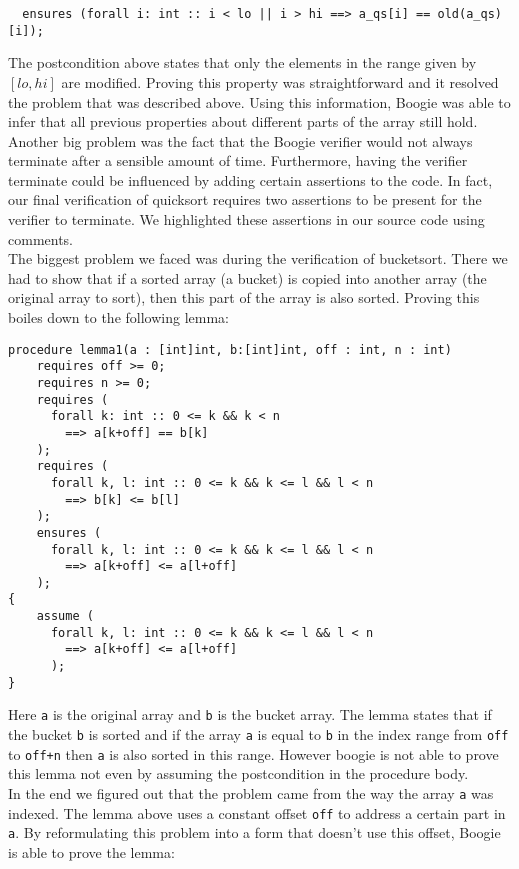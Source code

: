 \begin{verbatim}
  ensures (forall i: int :: i < lo || i > hi ==> a_qs[i] == old(a_qs)[i]);
\end{verbatim}

The postcondition above states that only the elements in the range given by $[lo, hi]$ are modified. Proving this
property was straightforward and it resolved the problem that was described above. Using this information, 
Boogie was able to infer that all previous properties about different parts of the array still hold.\\

Another big problem was the fact that the Boogie verifier would not always terminate after a 
sensible amount of time. Furthermore, having the verifier terminate could be influenced by
adding certain assertions to the code. In fact, our final verification of quicksort requires
two assertions to be present for the verifier to terminate. We highlighted these assertions in our
source code using comments.\\

The biggest problem we faced was during the verification of bucketsort. There we had to show
that if a sorted array (a bucket) is copied into another array (the original array to sort), 
then this part of the array is also sorted. Proving this boiles down to the following lemma:

\begin{verbatim}
procedure lemma1(a : [int]int, b:[int]int, off : int, n : int) 
    requires off >= 0;
    requires n >= 0;
    requires (
      forall k: int :: 0 <= k && k < n 
        ==> a[k+off] == b[k]
    );
    requires (
      forall k, l: int :: 0 <= k && k <= l && l < n 
        ==> b[k] <= b[l]
    );
    ensures (
      forall k, l: int :: 0 <= k && k <= l && l < n 
        ==> a[k+off] <= a[l+off]
    );
{
    assume (
      forall k, l: int :: 0 <= k && k <= l && l < n 
        ==> a[k+off] <= a[l+off]
      );
}
\end{verbatim}

Here \texttt{a} is the original array and \texttt{b} is the bucket array. The lemma states that 
if the bucket \texttt{b} is sorted and if the array \texttt{a} is equal to \texttt{b} in
the index range from \texttt{off} to \texttt{off+n} then \texttt{a} is also sorted in this range.
However boogie is not able to prove this lemma not even by assuming the postcondition in the
procedure body.\\

In the end we figured out that the problem came from the way the array \texttt{a} was indexed.
The lemma above uses a constant offset \texttt{off} to address a certain part in \texttt{a}. 
By reformulating this problem into a form that doesn't use this offset, Boogie is able
to prove the lemma:

